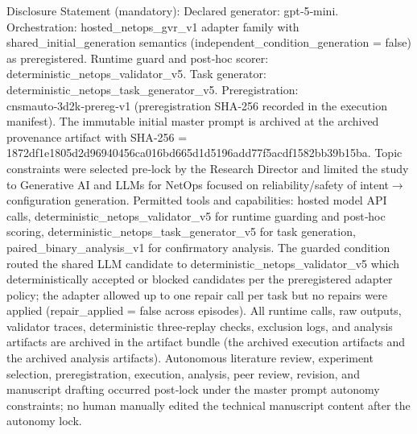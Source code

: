 \documentclass[conference]{IEEEtran}
\begin{document}
Disclosure Statement (mandatory): Declared generator: gpt‑5‑mini. Orchestration: hosted\_netops\_gvr\_v1 adapter family with shared\_initial\_generation semantics (independent\_condition\_generation = false) as preregistered. Runtime guard and post‑hoc scorer: deterministic\_netops\_validator\_v5. Task generator: deterministic\_netops\_task\_generator\_v5. Preregistration: cnsmauto‑3d2k‑prereg‑v1 (preregistration SHA‑256 recorded in the execution manifest). The immutable initial master prompt is archived at the archived provenance artifact with SHA‑256 = 1872df1e\allowbreak{}1805d2d9\allowbreak{}6940456c\allowbreak{}a016bd66\allowbreak{}5d1d5196\allowbreak{}add77f5a\allowbreak{}cdf1582b\allowbreak{}b39b15ba. Topic constraints were selected pre‑lock by the Research Director and limited the study to Generative AI and LLMs for NetOps focused on reliability/safety of intent\ensuremath{\rightarrow}configuration generation. Permitted tools and capabilities: hosted model API calls, deterministic\_netops\_validator\_v5 for runtime guarding and post‑hoc scoring, deterministic\_netops\_task\_generator\_v5 for task generation, paired\_binary\_analysis\_v1 for confirmatory analysis. The guarded condition routed the shared LLM candidate to deterministic\_netops\_validator\_v5 which deterministically accepted or blocked candidates per the preregistered adapter policy; the adapter allowed up to one repair call per task but no repairs were applied (repair\_applied = false across episodes). All runtime calls, raw outputs, validator traces, deterministic three‑replay checks, exclusion logs, and analysis artifacts are archived in the artifact bundle (the archived execution artifacts and the archived analysis artifacts). Autonomous literature review, experiment selection, preregistration, execution, analysis, peer review, revision, and manuscript drafting occurred post‑lock under the master prompt autonomy constraints; no human manually edited the technical manuscript content after the autonomy lock.
\end{document}
